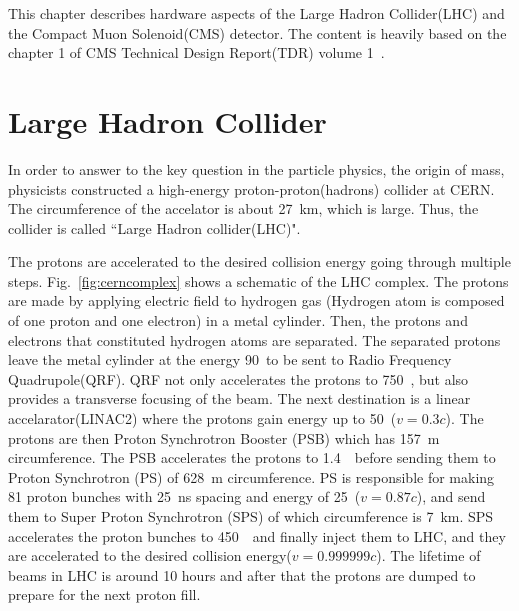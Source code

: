 This chapter describes hardware aspects of the Large Hadron Collider(LHC) 
and the Compact Muon Solenoid(CMS) detector. The content is heavily based on 
the chapter 1 of CMS Technical Design Report(TDR) volume 1~\cite{cmstdr1}.


\section{Large Hadron Collider} 


In order to answer to the key question in the particle physics, 
the origin of mass, physicists constructed a high-energy 
proton-proton(hadrons) collider at CERN. The circumference of the accelator 
is about 27~km, which is large. Thus, the collider is called 
``Large Hadron collider(LHC)". 

The protons are accelerated to the desired collision energy 
going through multiple steps. 
Fig.~\ref{fig:cerncomplex} shows a schematic of the LHC complex. 
The protons are made by applying electric field to hydrogen gas
(Hydrogen atom is composed of one proton and one electron) 
in a metal cylinder. Then, the protons and electrons that constituted 
hydrogen atoms are separated. The separated protons leave 
the metal cylinder at the energy 90~\keV to be 
sent to Radio Frequency Quadrupole(QRF). QRF not only accelerates 
the protons to 750~\keV, but also provides a transverse focusing 
of the beam. The next destination is a linear accelarator(LINAC2) 
where the protons gain energy up to 50~\MeV($v=0.3c$).
The protons are then Proton Synchrotron Booster (PSB) which has 
157~m circumference. The PSB accelerates the protons to 1.4~\GeV\
before sending them to Proton Synchrotron (PS) of 628~m circumference.
PS is responsible for making 81 proton bunches with 25~ns spacing and energy of 25~\GeV($v=0.87c$),  
and send them to Super Proton Synchrotron (SPS) of which circumference is 7~km. 
SPS accelerates the proton bunches to 450~\GeV\ and finally inject them 
to LHC, and they are accelerated to the desired collision energy($v=0.999999c$). 
The lifetime of beams in LHC is around 10 hours and after that 
the protons are dumped to prepare for the next proton fill. 

